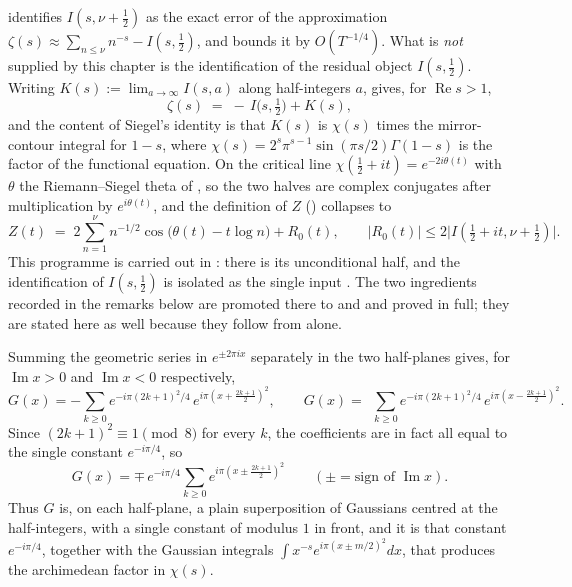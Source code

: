  identifies $I(s,\nu+\tfrac12)$ as the exact error of the
approximation $\zeta(s)\approx\sum_{n\le\nu}n^{-s}-I(s,\tfrac12)$, and
 bounds it by $O(T^{-1/4})$.  What is \emph{not} supplied by
this chapter is the identification of the residual object $I(s,\tfrac12)$.  Writing
$K(s):=\lim_{a\to\infty}I(s,a)$ along half-integers $a$,  gives,
for $\operatorname{Re}s>1$,
\[
  \zeta(s)\;=\;-\,I\bigl(s,\tfrac12\bigr)+K(s),
\]
and the content of Siegel's identity \cite{Siegel1932} is that $K(s)$ is
$\chi(s)$ times the mirror-contour integral for $1-s$, where
$\chi(s)=2^{s}\pi^{s-1}\sin(\pi s/2)\Gamma(1-s)$ is the factor of the functional
equation.  On the critical line $\chi(\tfrac12+it)=e^{-2i\theta(t)}$ with $\theta$ the
Riemann--Siegel theta of , so the two halves are complex conjugates
after multiplication by $e^{i\theta(t)}$, and the definition of $Z$
() collapses to
\[
  Z(t)\;=\;2\sum_{n=1}^{\nu}n^{-1/2}\cos\bigl(\theta(t)-t\log n\bigr)+R_{0}(t),
  \qquad \lvert R_{0}(t)\rvert\le 2\bigl|I(\tfrac12+it,\nu+\tfrac12)\bigr| .
\]
This programme is carried out in :  there is its
unconditional half, and the identification of $I(s,\tfrac12)$ is isolated as the single
input .  The two ingredients recorded in the remarks below are
promoted there to  and  and proved in
full; they are stated here as well because they follow from  alone.

\begin{remark}
\label{rem:rs_expansion}
Summing the geometric series in $e^{\pm2\pi ix}$ separately in the two half-planes gives,
for $\operatorname{Im}x>0$ and $\operatorname{Im}x<0$ respectively,
\[
  G(x)=-\sum_{k\ge0}e^{-i\pi(2k+1)^{2}/4}\,e^{i\pi\left(x+\frac{2k+1}2\right)^{2}},
  \qquad
  G(x)=\ \ \sum_{k\ge0}e^{-i\pi(2k+1)^{2}/4}\,e^{i\pi\left(x-\frac{2k+1}2\right)^{2}} .
\]
Since $(2k+1)^{2}\equiv1\pmod 8$ for every $k$, the coefficients are in fact all equal to
the single constant $e^{-i\pi/4}$, so
\[
  G(x)=\mp\,e^{-i\pi/4}\sum_{k\ge0}e^{i\pi\left(x\pm\frac{2k+1}2\right)^{2}}
  \qquad(\pm=\text{sign of }\operatorname{Im}x).
\]
Thus $G$ is, on each half-plane, a plain superposition of Gaussians centred at the
half-integers, with a single constant of modulus $1$ in front, and it is that constant
$e^{-i\pi/4}$, together with the Gaussian integrals
$\int x^{-s}e^{i\pi(x\pm m/2)^{2}}dx$, that produces the archimedean factor in $\chi(s)$.
\end{remark}

